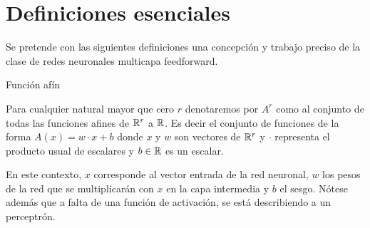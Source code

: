 %


\section{Definiciones esenciales}  

Se pretende con las siguientes definiciones una concepción y trabajo preciso de la clase de redes neuronales multicapa feedforward. 

\begin{definicion} Función afín

    Para cualquier natural mayor que cero $r$  denotaremos por $A^r$ como al conjunto de todas 
    las funciones afines de $\mathbb{R}^r$ a $\mathbb{R}$. Es decir el conjunto de funciones de la forma 
    $A(x) = w \cdot x + b$ donde $x$ y $w$ son vectores de $\mathbb{R}^r$ y $\cdot$ representa el producto 
    usual de escalares y $b \in \mathbb{R}$ es un escalar.  
    
\end{definicion}  

En este contexto, $x$ corresponde al vector entrada de la red neuronal, $w$ los pesos de la red
que se multiplicarán con $x$ en la capa intermedia y $b$ el sesgo. 
Nótese  además que a falta de una función de activación, se está describiendo a un perceptrón.

